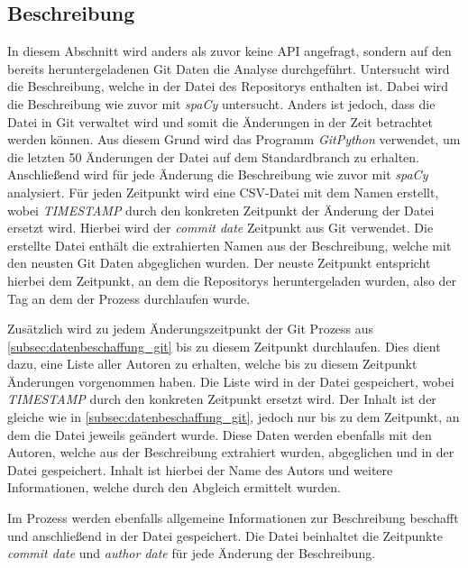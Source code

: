\subsection{Beschreibung}
\label{subsec:datenbeschaffung_beschreibung}
In diesem Abschnitt wird anders als zuvor keine API angefragt, sondern auf den bereits heruntergeladenen Git Daten die Analyse durchgeführt.
Untersucht wird die Beschreibung, welche in der  Datei des Repositorys enthalten ist.
Dabei wird die Beschreibung wie zuvor mit \emph{spaCy} untersucht.
Anders ist jedoch, dass die  Datei in Git verwaltet wird und somit die Änderungen in der Zeit betrachtet werden können.
Aus diesem Grund wird das Programm \emph{GitPython} verwendet, um die letzten 50 Änderungen der Datei auf dem Standardbranch zu erhalten.
Anschließend wird für jede Änderung die Beschreibung wie zuvor mit \emph{spaCy} analysiert.
Für jeden Zeitpunkt wird eine CSV-Datei mit dem Namen  erstellt, wobei \emph{TIMESTAMP} durch den konkreten Zeitpunkt der Änderung der Datei ersetzt wird.
Hierbei wird der \emph{commit date} Zeitpunkt aus Git verwendet.
Die erstellte Datei enthält die extrahierten Namen aus der Beschreibung, welche mit den neusten Git Daten abgeglichen wurden.
Der neuste Zeitpunkt entspricht hierbei dem Zeitpunkt, an dem die Repositorys heruntergeladen wurden, also der Tag an dem der Prozess durchlaufen wurde.

Zusätzlich wird zu jedem Änderungszeitpunkt der Git Prozess aus \autoref{subsec:datenbeschaffung_git} bis zu diesem Zeitpunkt durchlaufen.
Dies dient dazu, eine Liste aller Autoren zu erhalten, welche bis zu diesem Zeitpunkt Änderungen vorgenommen haben.
Die Liste wird in der Datei  gespeichert, wobei \emph{TIMESTAMP} durch den konkreten Zeitpunkt ersetzt wird.
Der Inhalt ist der gleiche wie in \autoref{subsec:datenbeschaffung_git}, jedoch nur bis zu dem Zeitpunkt, an dem die  Datei jeweils geändert wurde.
Diese Daten werden ebenfalls mit den Autoren, welche aus der Beschreibung extrahiert wurden, abgeglichen und in der Datei  gespeichert.
Inhalt ist hierbei der Name des Autors und weitere Informationen, welche durch den Abgleich ermittelt wurden.

Im Prozess werden ebenfalls allgemeine Informationen zur Beschreibung beschafft und anschließend in der Datei  gespeichert.
Die Datei beinhaltet die Zeitpunkte \emph{commit date} und \emph{author date} für jede Änderung der Beschreibung.
